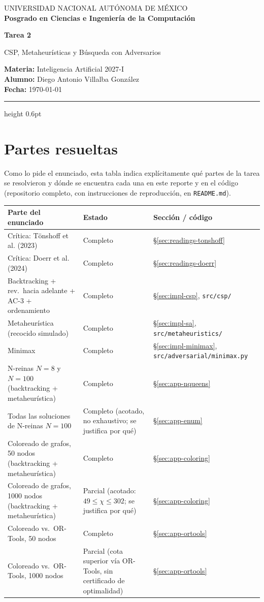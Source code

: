 \documentclass[11pt,onecolumn,letterpaper]{article}
\title{\tituloTrabajo}
\date{}
\newcommand{\code}[1]{\texttt{#1}}
\newcommand{\tituloTrabajo}{Tarea 2}
\newcommand{\materia}{Inteligencia Artificial 2027-I}
\newcommand{\subtituloTrabajo}{CSP, Metaheur\'isticas y B\'usqueda con Adversarios}
\newcommand{\alumno}{Diego Antonio Villalba Gonz\'alez}
\newcommand{\makecourseheader}{%
    \begingroup
    \setlength{\parindent}{0pt}%
    \noindent
    {\sffamily\color{black!65}\normalsize UNIVERSIDAD NACIONAL AUT\'ONOMA DE M\'EXICO \\
    \footnotesize\bfseries Posgrado en Ciencias e Ingenier\'ia de la Computaci\'on}\par
    \vspace{0.22cm}
    \sffamily
    {\LARGE\bfseries\color{black!90}\tituloTrabajo}\par
    \vspace{0.06cm}
    {\large\color{black!70}\subtituloTrabajo}\par
    \vspace{0.22cm}
    {\small
    \textbf{Materia:} \materia\\[-0.02cm]
    \textbf{Alumno:} \alumno\\[-0.02cm]
    \textbf{Fecha:} \today
    }
    \vspace{0.3cm}
    {\color{black!25}\hrule height 0.6pt}
    \vspace{0.5cm}
    \endgroup
}
\begin{document}
\sloppy
\makecourseheader

\tableofcontents
\vspace{0.4cm}

\section{Partes resueltas}

Como lo pide el enunciado, esta tabla indica expl\'icitamente qu\'e partes de la tarea se
resolvieron y d\'onde se encuentra cada una en este reporte y en el c\'odigo (repositorio
completo, con instrucciones de reproducci\'on, en \code{README.md}).

\begin{center}
\small
\begin{tabular}{@{}p{7.7cm}p{2.1cm}p{5.6cm}@{}}
\toprule
\textbf{Parte del enunciado} & \textbf{Estado} & \textbf{Secci\'on / c\'odigo} \\
\midrule
Cr\'itica: T\"onshoff et al. (2023) & Completo & \S\ref{sec:readings-tonshoff} \\
Cr\'itica: Doerr et al. (2024) & Completo & \S\ref{sec:readings-doerr} \\
Backtracking + rev.\ hacia adelante + AC-3 + ordenamiento & Completo & \S\ref{sec:impl-csp}, \code{src/csp/} \\
Metaheur\'istica (recocido simulado) & Completo & \S\ref{sec:impl-sa}, \code{src/metaheuristics/} \\
Minimax & Completo & \S\ref{sec:impl-minimax}, \code{src/adversarial/minimax.py} \\
N-reinas $N=8$ y $N=100$ (backtracking + metaheur\'istica) & Completo & \S\ref{sec:app-nqueens} \\
Todas las soluciones de N-reinas $N=100$ & Completo (acotado, no exhaustivo; se justifica por qu\'e) & \S\ref{sec:app-enum} \\
Coloreado de grafos, 50 nodos (backtracking + metaheur\'istica) & Completo & \S\ref{sec:app-coloring} \\
Coloreado de grafos, 1000 nodos (backtracking + metaheur\'istica) & Parcial (acotado: $49\le\chi\le302$; se justifica por qu\'e) & \S\ref{sec:app-coloring} \\
Coloreado vs.\ OR-Tools, 50 nodos & Completo & \S\ref{sec:app-ortools} \\
Coloreado vs.\ OR-Tools, 1000 nodos & Parcial (cota superior v\'ia OR-Tools, sin certificado de optimalidad) & \S\ref{sec:app-ortools} \\

\end{tabular}
\end{center}
\end{document}
